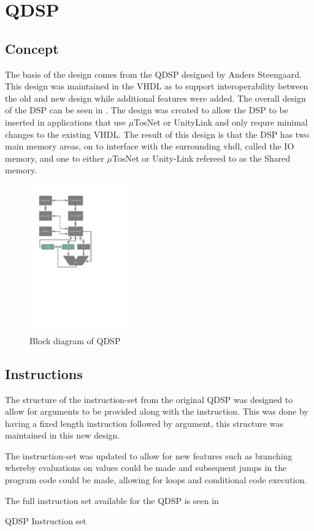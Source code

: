 \chapter{QDSP}
\section{Concept}
The basis of the design comes from the QDSP designed by Anders Steengaard. This design was maintained in the VHDL as to support interoperability between the old and new design while additional features were added. The overall design of the DSP can be seen in . The design was created to allow the DSP to be inserted in applications that use $\mu$TosNet or UnityLink and only requre minimal changes to the existing VHDL. The result of this design is that the DSP has two main memory areas, on to interface with the surrounding vhdl, called the IO memory, and one to either $\mu$TosNet or Unity-Link refereed to as the Shared memory.

\begin{figure}[h]
	\centering
		\includegraphics[width=0.40\textwidth]{../includes/pictures/DSPDiagram.pdf}
	\caption{Block diagram of QDSP}
	\label{fig:DSPDiagram}
\end{figure}

\section{Instructions}

The structure of the instruction-set from the original QDSP was designed to allow for arguments to be provided along with the instruction. This was done by having a fixed length instruction followed by argument, this structure was maintained in this new design.

The instruction-set was updated to allow for new features such as branching whereby evaluations on values could be made and subsequent jumps in the program code could be made, allowing for loops and conditional code execution.

The full instruction set available for the QDSP is seen in 

\begin{table}[ht]
	\centering
		
	\caption{QDSP Instruction set}
	\label{tab:instruction-set}
\end{table}